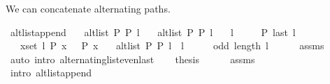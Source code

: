 \begin{isabellebody}
\begin{isamarkuptext}
We can concatenate alternating paths.%
\end{isamarkuptext}\isamarkuptrue%
\isamarkupfalse%
\ alt{\isacharunderscore}{\kern0pt}list{\isacharunderscore}{\kern0pt}append{\isacharunderscore}{\kern0pt}{}{\isacharprime}{\kern0pt}{\isacharcolon}{\kern0pt}\isanewline
\ \ \ {\isachardoublequoteopen}alt{\isacharunderscore}{\kern0pt}list\ P{}\ P{}\ l{}{\isachardoublequoteclose}\isanewline
\ \ \ {\isachardoublequoteopen}alt{\isacharunderscore}{\kern0pt}list\ P{}\ P{}\ l{}{\isachardoublequoteclose}\isanewline
\ \ \ {\isachardoublequoteopen}l{}\ {\isasymnoteq}\ {\isacharbrackleft}{\kern0pt}{\isacharbrackright}{\kern0pt}{\isachardoublequoteclose}\isanewline
\ \ \ {\isachardoublequoteopen}P{}\ {\isacharparenleft}{\kern0pt}last\ l{}{\isacharparenright}{\kern0pt}{\isachardoublequoteclose}\isanewline
\ \ \ {\isachardoublequoteopen}{\isasymforall}x{\isasymin}set\ l{}{\isachardot}{\kern0pt}\ P{}\ x\ {\isasymlongleftrightarrow}\ {\isasymnot}\ P{}\ x{\isachardoublequoteclose}\isanewline
\ \ \ {\isachardoublequoteopen}alt{\isacharunderscore}{\kern0pt}list\ P{}\ P{}\ {\isacharparenleft}{\kern0pt}l{}\ {\isacharat}{\kern0pt}\ l{}{\isacharparenright}{\kern0pt}{\isachardoublequoteclose}%
\endisataginvisible
{\isafoldinvisible}%
%
\isadeliminvisible
\isanewline
%
\endisadeliminvisible
%
\isadelimproof
%
\endisadelimproof
%
\isatagproof
{}\isamarkupfalse%
\ {\isacharminus}{\kern0pt}\isanewline
\ \ \isamarkupfalse%
\ {\isachardoublequoteopen}odd\ {\isacharparenleft}{\kern0pt}length\ l{}{\isacharparenright}{\kern0pt}{\isachardoublequoteclose}\isanewline
\ \ \ \ \isamarkupfalse%
\ assms\isanewline
\ \ \ \ \isamarkupfalse%
\ {\isacharparenleft}{\kern0pt}auto\ intro{\isacharcolon}{\kern0pt}\ alternating{\isacharunderscore}{\kern0pt}list{\isacharunderscore}{\kern0pt}even{\isacharunderscore}{\kern0pt}last{\isacharparenright}{\kern0pt}\isanewline
\ \ \isamarkupfalse%
\ {\isacharquery}{\kern0pt}thesis\isanewline
\ \ \ \ \isamarkupfalse%
\ assms{\isacharparenleft}{\kern0pt}{}{\isacharcomma}{\kern0pt}\ {}{\isacharparenright}{\kern0pt}\isanewline
\ \ \ \ \isamarkupfalse%
\ {\isacharparenleft}{\kern0pt}intro\ alt{\isacharunderscore}{\kern0pt}list{\isacharunderscore}{\kern0pt}append{\isacharunderscore}{\kern0pt}{}{\isacharparenright}{\kern0pt}\isanewline

\end{isabellebody}
